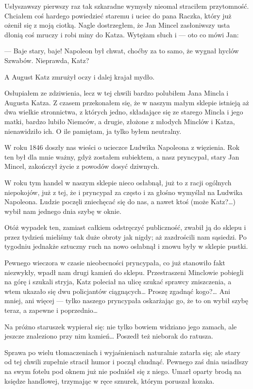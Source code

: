 \documentclass{book}
\begin{document}
Usłyszawszy pierwszy raz tak szkaradne wymysły nieomal straciłem przytomność. Chciałem coś hardego powiedzieć staremu i uciec do pana Raczka, który już ożenił się z moją ciotką. Nagle dostrzegłem, że Jan Mincel zasłoniwszy usta dłonią coś mruczy i robi miny do Katza. Wytężam słuch i — oto co mówi Jan:

— Baje stary, baje! Napoleon był chwat, choćby za to samo, że wygnał hyclów Szwabów. Nieprawda, Katz?

A August Katz zmrużył oczy i dalej krajał mydło.


Osłupiałem ze zdziwienia, lecz w tej chwili bardzo polubiłem Jana Mincla i Augusta Katza. Z czasem przekonałem się, że w naszym małym sklepie istnieją aż dwa wielkie stronnictwa, z których jedno, składające się ze starego Mincla i jego matki, bardzo lubiło Niemców, a drugie, złożone z młodych Minclów i Katza, nienawidziło ich. O ile pamiętam, ja tylko byłem neutralny.

W roku 1846 doszły nas wieści o ucieczce Ludwika Napoleona z więzienia. Rok ten był dla mnie ważny, gdyż zostałem subiektem, a nasz pryncypał, stary Jan Mincel, zakończył życie z powodów dosyć dziwnych.

W roku tym handel w naszym sklepie nieco osłabnął, już to z racji ogólnych niepokojów, już z tej, że i pryncypał za często i za głośno wymyślał na Ludwika Napoleona. Ludzie poczęli zniechęcać się do nas, a nawet ktoś (może Katz?…) wybił nam jednego dnia szybę w oknie.

Otóż wypadek ten, zamiast całkiem odstręczyć publiczność, zwabił ją do sklepu i przez tydzień mieliśmy tak duże obroty jak nigdy; aż zazdrościli nam sąsiedzi. Po tygodniu jednakże sztuczny ruch na nowo osłabnął i znowu były w sklepie pustki.

Pewnego wieczora w czasie nieobecności pryncypała, co już stanowiło fakt niezwykły, wpadł nam drugi kamień do sklepu. Przestraszeni Minclowie pobiegli na górę i szukali stryja, Katz poleciał na ulicę szukać sprawcy zniszczenia, a wtem ukazało się dwu policjantów ciągnących… Proszę zgadnąć kogo?… Ani mniej, ani więcej — tylko naszego pryncypała oskarżając go, że to on wybił szybę teraz, a zapewne i poprzednio…

Na próżno staruszek wypierał się: nie tylko bowiem widziano jego zamach, ale jeszcze znaleziono przy nim kamień… Poszedł też nieborak do ratusza.

Sprawa po wielu tłomaczeniach i wyjaśnieniach naturalnie zatarła się; ale stary od tej chwili zupełnie stracił humor i począł chudnąć. Pewnego zaś dnia usiadłszy na swym fotelu pod oknem już nie podniósł się z niego. Umarł oparty brodą na księdze handlowej, trzymając w ręce sznurek, którym poruszał kozaka.
\end{document}
